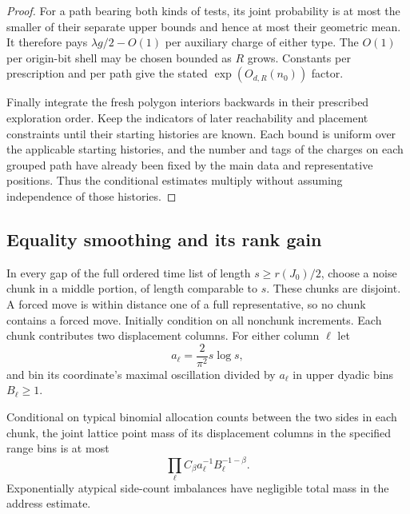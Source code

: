 \begin{proof}
For a path bearing both kinds of tests, its joint probability is at
most the smaller of their separate upper bounds and hence at most
their geometric mean.  It therefore pays
$\lambda g/2-O(1)$ per auxiliary charge of either type.  The
$O(1)$ per origin-bit shell may be chosen bounded as $R$ grows.
Constants per prescription and per path give the stated
$\exp(O_{d,R}(n_0))$ factor.

Finally integrate the fresh polygon interiors backwards in their
prescribed exploration order.  Keep the indicators of later
reachability and placement constraints until their starting histories
are known.  Each bound is uniform over the applicable starting
histories, and the number and tags of the charges on each grouped
path have already been fixed by the main data and representative
positions.  Thus the conditional estimates multiply without assuming
independence of those histories.
\end{proof}

\subsection{Equality smoothing and its rank gain}

In every gap of the full ordered time list of length
$s\ge r(J_0)/2$, choose a noise chunk in a middle portion, of
length comparable to $s$.  These chunks are disjoint.  A forced
move is within distance one of a full representative, so no chunk
contains a forced move.  Initially condition on all nonchunk
increments.  Each chunk contributes two displacement columns.
For either column $\ell$ let
\[
                  a_\ell=\frac{2}{\pi^2}s\log s,
\]
and bin its coordinate's maximal oscillation divided by $a_\ell$
in upper dyadic bins $B_\ell\ge1$.

\begin{lemma}\label{addr:chunk-density}
Conditional on typical binomial allocation counts between the two
sides in each chunk, the joint lattice point mass of its displacement
columns in the specified range bins is at most
\begin{equation}\label{addr:chunk-mass}
                  \prod_\ell C_\beta a_\ell^{-1}
                                      B_\ell^{-1-\beta}.
\end{equation}
Exponentially atypical side-count imbalances have negligible total
mass in the address estimate.
\end{lemma}

